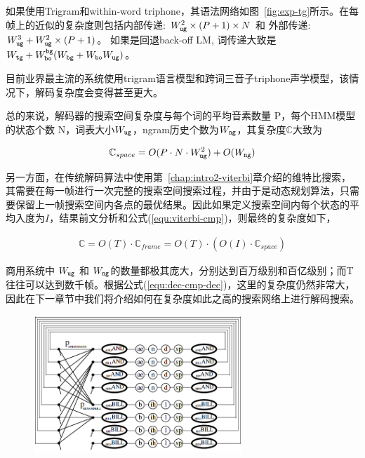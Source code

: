 如果使用Trigram和within-word triphone，其语法网络如图~\ref{fig:exp-tg}所示。在每帧上的近似的复杂度则包括内部传递: $W_{\tt ug}^2\times (P+1)\times N$ 和 外部传递: $W_{\tt ug}^3 + W_{\tt ug}^2\times (P+1)$。
如果是回退back-off LM, 词传递大致是$W_{\tt tg}+W_{\tt bo}^{\tt bg}(W_{\tt bg}+W_{\tt bo}W_{\tt ug}) $。

目前业界最主流的系统使用trigram语言模型和跨词三音子triphone声学模型，该情况下，解码复杂度会变得甚至更大。

总的来说，解码器的搜索空间复杂度与每个词的平均音素数量 P，每个HMM模型的状态个数 N，词表大小$W_{\tt ug}$，ngram历史个数为$W_{\tt ng}$，其复杂度$\mathbb{C}$大致为

\begin{equation}
\label{equ:dec-cmp-space}
 \begin{split}
\mathbb{C}_{space} = O(P\cdot N \cdot W_{\tt ug}^2)+O(W_{\tt ng})
 \end{split}
\end{equation}

另一方面，在传统解码算法中使用第~\ref{chap:intro2-viterbi}章介绍的维特比搜索，其需要在每一帧进行一次完整的搜索空间搜索过程，并由于是动态规划算法，只需要保留上一帧搜索空间内各点的最优结果。因此如果定义搜索空间内每个状态的平均入度为$I$，结果前文分析和公式(\ref{equ:viterbi-cmp})，则最终的复杂度如下，

\begin{equation}
\label{equ:dec-cmp-dec}
 \begin{split}
\mathbb{C} = O(T)\cdot \mathbb{C}_{frame} = O(T)\cdot (O(I) \cdot \mathbb{C}_{space})
 \end{split}
\end{equation}

商用系统中 $W_{\tt ug}$ 和 $W_{\tt ng}$的数量都极其庞大，分别达到百万级别和百亿级别；而T往往可以达到数千帧。根据公式(\ref{equ:dec-cmp-dec})，这里的复杂度仍然非常大，因此在下一章节中我们将介绍如何在复杂度如此之高的搜索网络上进行解码搜索。

\begin{figure}[!htp]
  \centering
    \captionstyle{\centering}
    \includegraphics[clip=true, width=0.7\textwidth]{figure/tg.png}
\end{figure}

